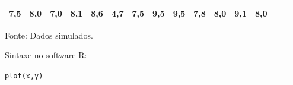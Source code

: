 \documentclass[12pt,brazil,oneside]{book}
\begin{document}
\begin{longtable}[]{@{}lllllllllllllll@{}}
\begin{minipage}[t]{0.04\columnwidth}
7,5\strut
\end{minipage} & \begin{minipage}[t]{0.04\columnwidth}\raggedright
8,0\strut
\end{minipage} & \begin{minipage}[t]{0.04\columnwidth}\raggedright
7,0\strut
\end{minipage} & \begin{minipage}[t]{0.04\columnwidth}\raggedright
8,1\strut
\end{minipage} & \begin{minipage}[t]{0.04\columnwidth}\raggedright
8,6\strut
\end{minipage} & \begin{minipage}[t]{0.04\columnwidth}\raggedright
4,7\strut
\end{minipage} & \begin{minipage}[t]{0.04\columnwidth}\raggedright
7,5\strut
\end{minipage} & \begin{minipage}[t]{0.04\columnwidth}\raggedright
9,5\strut
\end{minipage} & \begin{minipage}[t]{0.04\columnwidth}\raggedright
9,5\strut
\end{minipage} & \begin{minipage}[t]{0.04\columnwidth}\raggedright
7,8\strut
\end{minipage} & \begin{minipage}[t]{0.04\columnwidth}\raggedright
8,0\strut
\end{minipage} & \begin{minipage}[t]{0.04\columnwidth}\raggedright
9,1\strut
\end{minipage} & \begin{minipage}[t]{0.04\columnwidth}\raggedright
8,0\strut
\end{minipage}\tabularnewline
\bottomrule
\end{longtable}

Fonte: Dados simulados.

Sintaxe no software R:

\texttt{plot(x,y)}
\end{document}
